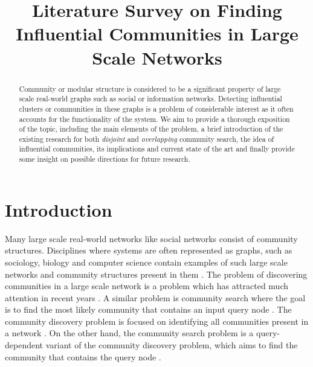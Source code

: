 \documentclass[conference]{IEEEtran}
\begin{document}
\pagestyle{plain}

\title{
Literature Survey on Finding Influential Communities in Large Scale Networks}

\author{
\and
{}
\and
{}
}

\maketitle

\begin{abstract}

Community or modular structure is considered to be a significant property of large scale real-world graphs such as social or information networks. Detecting influential clusters or communities in these graphs is a problem of considerable interest as it often accounts for the functionality of the system. We aim to provide a thorough exposition of the topic, including the main elements of the problem, a brief introduction of the existing research for both \textit{disjoint} and \textit{overlapping} community search, the idea of influential communities, its implications and current state of the art and finally provide some insight on possible directions for future research.

\end{abstract}

\section{Introduction}

Many large scale real-world networks like social networks consist of community structures. Disciplines where systems are often represented as graphs, such as sociology, biology and computer science contain examples of such large scale networks and community structures present in them \cite{Li:2015:ICS:2735479.2735484}. The problem of discovering communities in a large scale network is a problem which has attracted much attention in recent years \cite{FORTUNATO201075, Xie:2013:OCD:2501654.2501657}. A similar problem is community search where the goal is to find the most likely community that contains an input query node \cite{Sozio:2010:CPP:1835804.1835923, Cui:2013:OSO:2463676.2463722}. The community discovery problem is focused on identifying all communities present in a network \cite{FORTUNATO201075}. On the other hand, the community search problem is a query-dependent variant of the community discovery problem, which aims to find the community that contains the query node \cite{Sozio:2010:CPP:1835804.1835923}.
\end{document}
